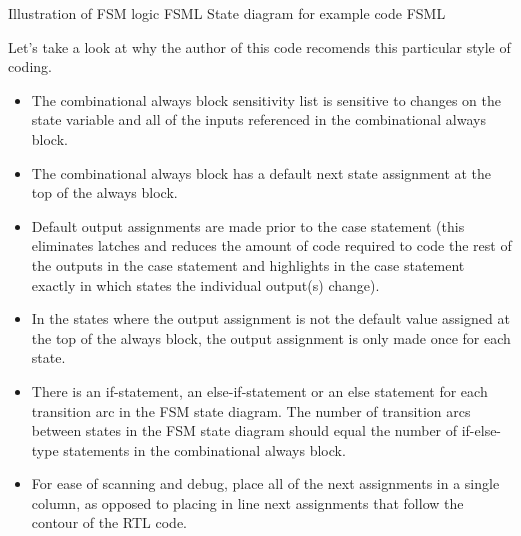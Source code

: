               {Illustration of FSM logic\cite{Sunburst:FSMs}}
              {FSML}
              {State diagram for example code\cite{Sunburst:FSMs}}
              {FSML}

      
      Let's take a look at why the author of this code recomends this particular style of coding.

      \begin{itemize}
        \item The combinational always block sensitivity list is sensitive to changes on the state variable and all of the inputs referenced in the combinational always block.
        \item The combinational always block has a default next state assignment at the top of the always block.
        \item Default output assignments are made prior to the case statement (this eliminates latches and reduces the amount of code required to code the rest of the outputs in the case statement and highlights in the case statement exactly in which states the individual output(s) change).
        \item In the states where the output assignment is not the default value assigned at the top of the always block, the output assignment is only made once for each state.
        \item There is an if-statement, an else-if-statement or an else statement for each transition arc in the FSM state diagram. The number of transition arcs between states in the FSM state diagram should equal the number of if-else-type statements in the combinational always block.
        \item For ease of scanning and debug, place all of the next assignments in a single column, as opposed to placing in line next assignments that follow the contour of the RTL code.
      \end{itemize}

